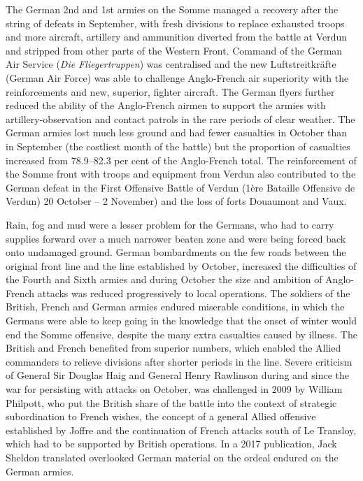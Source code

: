 \documentclass[a4paper,]{book}
\begin{document}
The German 2nd and 1st armies on the Somme managed a recovery after the string of defeats in September, with fresh divisions to replace exhausted troops and more aircraft, artillery and ammunition diverted from the battle at Verdun and stripped from other parts of the Western Front. Command of the German Air Service (\textit{Die Fliegertruppen}) was centralised and the new Luftstreitkräfte (German Air Force) was able to challenge Anglo-French air superiority with the reinforcements and new, superior, fighter aircraft. The German flyers further reduced the ability of the Anglo-French airmen to support the armies with artillery-observation and contact patrols in the rare periods of clear weather. The German armies lost much less ground and had fewer casualties in October than in September (the costliest month of the battle) but the proportion of casualties increased from 78.9–82.3 per cent of the Anglo-French total. The reinforcement of the Somme front with troops and equipment from Verdun also contributed to the German defeat in the First Offensive Battle of Verdun (1ère Bataille Offensive de Verdun) 20 October – 2 November) and the loss of forts Douaumont and Vaux.

Rain, fog and mud were a lesser problem for the Germans, who had to carry supplies forward over a much narrower beaten zone and were being forced back onto undamaged ground. German bombardments on the few roads between the original front line and the line established by October, increased the difficulties of the Fourth and Sixth armies and during October the size and ambition of Anglo-French attacks was reduced progressively to local operations. The soldiers of the British, French and German armies endured miserable conditions, in which the Germans were able to keep going in the knowledge that the onset of winter would end the Somme offensive, despite the many extra casualties caused by illness. The British and French benefited from superior numbers, which enabled the Allied commanders to relieve divisions after shorter periods in the line. Severe criticism of General Sir Douglas Haig and General Henry Rawlinson during and since the war for persisting with attacks on October, was challenged in 2009 by William Philpott, who put the British share of the battle into the context of strategic subordination to French wishes, the concept of a general Allied offensive established by Joffre and the continuation of French attacks south of Le Transloy, which had to be supported by British operations. In a 2017 publication, Jack Sheldon translated overlooked German material on the ordeal endured on the German armies. 
\end{document}
